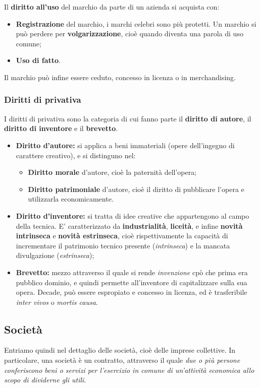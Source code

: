 \documentclass[a4paper,11pt]{article}
\begin{document}
\begin{itemize}
		Il \textbf{diritto all'uso} del marchio da parte di un azienda si acquista con:
		\begin{itemize}
			\item \textbf{Registrazione} del marchio, i marchi celebri sono più protetti. Un marchio si può perdere per \textbf{volgarizzazione}, cioè quando diventa una parola di uso comune;
			\item \textbf{Uso di fatto}. 
		\end{itemize}

		Il marchio può infine essere ceduto, concesso in licenza o in merchandising.
		
\end{itemize}

\subsubsection{Diritti di privativa}
I diritti di privativa sono la categoria di cui fanno parte il \textbf{diritto di autore}, il \textbf{diritto di inventore} e il \textbf{brevetto}.
\begin{itemize}
	\item \textbf{Diritto d'autore:} si applica a beni immateriali (opere dell'ingegno di carattere creativo), e si distinguno nel:
		\begin{itemize}
			\item \textbf{Diritto morale} d'autore, cioè la paternità dell'opera;
			\item \textbf{Diritto patrimoniale} d'autore, cioè il diritto di pubblicare l'opera e utilizzarla economicamente.
		\end{itemize}
	\item \textbf{Diritto d'inventore:} si tratta di idee creative che appartengono al campo della tecnica. E' caratterizzato da \textbf{industrialità}, \textbf{liceità}, e infine \textbf{novità intrinseca} e \textbf{novità estrinseca}, cioè rispettivamente la capacità di incrementare il patrimonio tecnico presente (\textit{intrinseca}) e la mancata divulgazione (\textit{estrinseca});
	\item \textbf{Brevetto:} mezzo attraverso il quale si rende \textit{invenzione} cpò che prima era pubblico dominio, e quindi permette all'inventore di capitalizzare sulla sua opera. Decade, può essere espropiato e concesso in licenza, ed è trasferibile \textit{inter vivos} o \textit{mortis causa}.
\end{itemize}

\subsection{Società}
Entriamo quindi nel dettaglio delle società, cioè delle imprese collettive.
In particolare, una società è un contratto, attraverso il quale \textit{due o più persone conferiscono beni o servizi per l'esercizio in comune di un'attività economica allo scopo di dividerne gli utili}.
\end{document}
